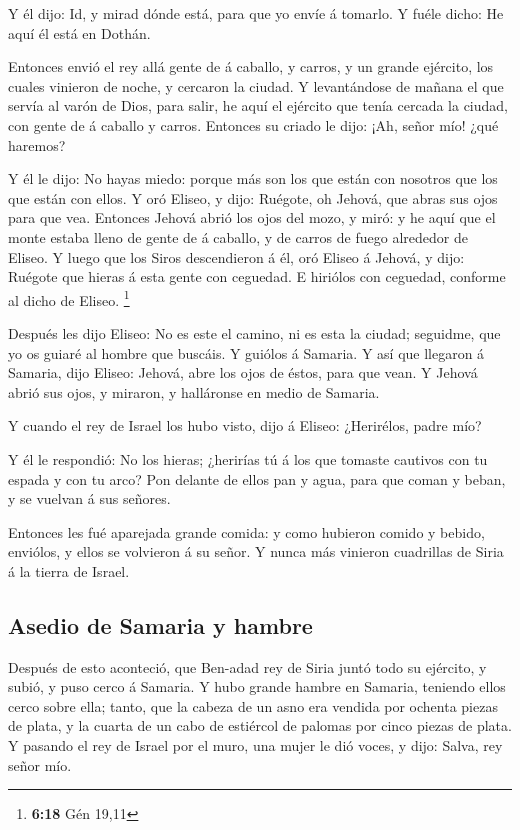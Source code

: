  Y él dijo: Id, y mirad dónde está, para que yo envíe á
tomarlo. Y fuéle dicho: He aquí él está en Dothán.

 Entonces envió el rey allá gente de á caballo, y carros, y
un grande ejército, los cuales vinieron de noche, y cercaron la ciudad.
 Y levantándose de mañana el que servía al varón de Dios,
para salir, he aquí el ejército que tenía cercada la ciudad, con gente
de á caballo y carros. Entonces su criado le dijo: ¡Ah, señor mío! ¿qué
haremos?

 Y él le dijo: No hayas miedo: porque más son los que están
con nosotros que los que están con ellos.  Y oró Eliseo, y
dijo: Ruégote, oh Jehová, que abras sus ojos para que vea. Entonces
Jehová abrió los ojos del mozo, y miró: y he aquí que el monte estaba
lleno de gente de á caballo, y de carros de fuego alrededor de Eliseo.
 Y luego que los Siros descendieron á él, oró Eliseo á
Jehová, y dijo: Ruégote que hieras á esta gente con ceguedad. E hiriólos
con ceguedad, conforme al dicho de Eliseo. \footnote{\textbf{6:18} Gén
  19,11}

 Después les dijo Eliseo: No es este el camino, ni es esta
la ciudad; seguidme, que yo os guiaré al hombre que buscáis. Y guiólos á
Samaria.  Y así que llegaron á Samaria, dijo Eliseo:
Jehová, abre los ojos de éstos, para que vean. Y Jehová abrió sus ojos,
y miraron, y halláronse en medio de Samaria.

 Y cuando el rey de Israel los hubo visto, dijo á Eliseo:
¿Herirélos, padre mío?

 Y él le respondió: No los hieras; ¿herirías tú á los que
tomaste cautivos con tu espada y con tu arco? Pon delante de ellos pan y
agua, para que coman y beban, y se vuelvan á sus señores.

 Entonces les fué aparejada grande comida: y como hubieron
comido y bebido, enviólos, y ellos se volvieron á su señor. Y nunca más
vinieron cuadrillas de Siria á la tierra de Israel.

\hypertarget{asedio-de-samaria-y-hambre}{%
\subsection{Asedio de Samaria y
hambre}\label{asedio-de-samaria-y-hambre}}

 Después de esto aconteció, que Ben-adad rey de Siria juntó
todo su ejército, y subió, y puso cerco á Samaria.  Y hubo
grande hambre en Samaria, teniendo ellos cerco sobre ella; tanto, que la
cabeza de un asno era vendida por ochenta piezas de plata, y la cuarta
de un cabo de estiércol de palomas por cinco piezas de plata.
 Y pasando el rey de Israel por el muro, una mujer le dió
voces, y dijo: Salva, rey señor mío.

